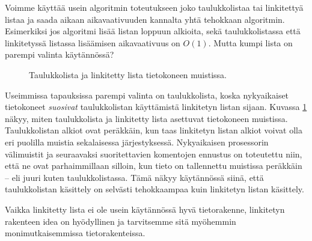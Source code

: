 Voimme käyttää usein algoritmin toteutukseen joko
taulukkolistaa tai linkitettyä listaa ja saada aikaan
aikavaativuuden kannalta yhtä tehokkaan algoritmin.
Esimerkiksi jos algoritmi lisää listan loppuun alkioita,
sekä taulukkolistassa että linkitetyssä listassa
lisäämisen aikavaativuus on $O(1)$.
Mutta kumpi lista on parempi valinta käytännössä?

\begin{figure}
\center
{}
\caption{Taulukkolista ja linkitetty lista tietokoneen muistissa.}
\label{fig:taulin}
\end{figure}

Useimmissa tapauksissa parempi valinta on taulukkolista,
koska nykyaikaiset tietokoneet
\emph{suosivat} taulukkolistan käyttämistä linkitetyn listan sijaan.
Kuvassa \ref{fig:taulin} näkyy, miten taulukkolista ja linkitetty lista
asettuvat tietokoneen muistissa.
Taulukkolistan alkiot ovat peräkkäin, kun taas linkitetyn
listan alkiot voivat olla eri puolilla muistia sekalaisessa
järjestyksessä.
Nykyaikaisen prosessorin välimuistit ja seuraavaksi suoritettavien
komentojen ennustus
on toteutettu niin, että ne ovat parhaimmillaan silloin,
kun tieto on tallennettu muistissa peräkkäin -- eli juuri kuten
taulukkolistassa.
Tämä näkyy käytännössä siinä, että taulukkolistan käsittely on selvästi
tehokkaampaa kuin linkitetyn listan käsittely.

Vaikka linkitetty lista ei ole usein käytännössä hyvä tietorakenne,
linkitetyn rakenteen idea on hyödyllinen
ja tarvitsemme sitä myöhemmin monimutkaisemmissa tietorakenteissa.
